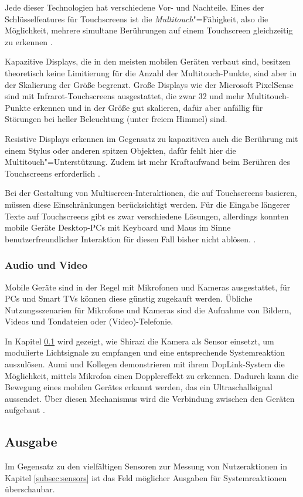 Jede dieser Technologien hat verschiedene Vor- und Nachteile. Eines der Schlüsselfeatures für Touchscreens ist die \textit{Multitouch}"=Fähigkeit, also die Möglichkeit, mehrere simultane Berührungen auf einem Touchscreen gleichzeitig zu erkennen \citep[39]{Walker2015}.

Kapazitive Displays, die in den meisten mobilen Geräten verbaut sind, besitzen theoretisch keine Limitierung für die Anzahl der Multitouch-Punkte, sind aber in der Skalierung der Größe begrenzt. Große Displays wie der Microsoft PixelSense sind mit Infrarot-Touchscreens ausgestattet, die zwar 32 und mehr Multitouch-Punkte erkennen und in der Größe gut skalieren, dafür aber anfällig für Störungen bei heller Beleuchtung (\zb unter freiem Himmel) sind.

Resistive Displays erkennen im Gegensatz zu kapazitiven auch die Berührung mit einem Stylus oder anderen spitzen Objekten, dafür fehlt hier die Multitouch"=Unterstützung. Zudem ist mehr Kraftaufwand beim Berühren des Touchscreens erforderlich \citep[47,56,76]{Walker2015}.

Bei der Gestaltung von Multiscreen-Interaktionen, die auf Touchscreens basieren, müssen diese Einschränkungen berücksichtigt werden. Für die Eingabe längerer Texte auf Touchscreens gibt es zwar verschiedene Lösungen, allerdings konnten mobile Geräte Desktop-PCs mit Keyboard und Maus im Sinne benutzerfreundlicher Interaktion für diesen Fall bisher nicht ablösen. \citep[46]{Banga2014}.

\subsubsection{Audio und Video}
Mobile Geräte sind in der Regel mit Mikrofonen und Kameras ausgestattet, für PCs und Smart TVs können diese günstig zugekauft werden. Übliche Nutzungsszenarien für  Mikrofone und Kameras sind die Aufnahme von Bildern, Videos und Tondateien oder (Video)-Telefonie.

In Kapitel \ref{subsec:ausgabe} wird gezeigt, wie Shirazi die Kamera als Sensor einsetzt, um modulierte Lichtsignale zu empfangen und eine entsprechende Systemreaktion auszulösen. Aumi und Kollegen demonstrieren mit ihrem DopLink-System die Möglichkeit, mittels Mikrofon einen Dopplereffekt zu erkennen. Dadurch kann die Bewegung eines mobilen Gerätes erkannt werden, das ein Ultraschallsignal aussendet. Über diesen Mechanismus wird die Verbindung zwischen den Geräten aufgebaut \citep{Aumi2013}.

\subsection{Ausgabe}
\label{subsec:ausgabe}
Im Gegensatz zu den vielfältigen Sensoren zur Messung von Nutzeraktionen in Kapitel \ref{subsec:sensors} ist das Feld möglicher Ausgaben für Systemreaktionen überschaubar. 

